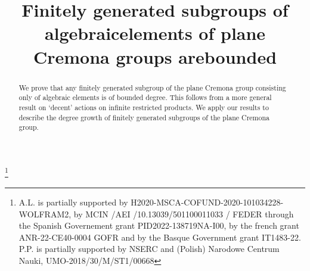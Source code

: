 \documentclass[JEP,XML,SOM,Unicode, NoEqCountersInSection,published]{cedram}
\theoremstyle{plain}
\theoremstyle{definition}
\begin{document}
\frontmatter

\title[Finitely generated subgroups of algebraic elements]{Finitely generated subgroups of algebraic\nobreakspace elements of plane Cremona groups are\nobreakspace bounded}

\author[\initial{A.} \lastname{Lonjou}]{ }
\address{Department of Mathematics, University of the Basque Country UPV/EHU, \\
Sarriena s/n, 48940 Leioa, Bizkaia, Spain\\
\& IKERBASQUE, Basque Foundation for Science,\\ Bilbao, Spain}
\urladdr{}

\author[\initial{P.} \lastname{Przytycki}]{ }
\address{Department of Mathematics and Statistics,
McGill University,\\
Burnside Hall,
805 Sherbrooke Street West,
Montreal, QC,
H3A 0B9, Canada}
\urladdr{}

\author[\initial{C.} \lastname{Urech}]{ }
\address{Department of Mathematics,
ETH Zürich,\\
Rämistrasse 101,
8092 Zürich, Switzerland}
\urladdr{}

\thanks{A.L. is partially supported by H2020-MSCA-COFUND-2020-101034228-WOLFRAM2, by MCIN /AEI /10.13039/501100011033 / FEDER through the Spanish Governement grant PID2022-138719NA-I00, by the french grant ANR-22-CE40-0004 GOFR and by the Basque Government grant IT1483-22. P.P. is partially supported by NSERC and (Polish) Narodowe Centrum Nauki, UMO-2018/30/M/ST1/00668}

\begin{abstract}
We prove that any finitely generated subgroup of the plane Cremona group consisting only of algebraic elements is of bounded degree. This follows from a more general result on `decent' actions on infinite restricted products. We apply our results to describe the degree growth of finitely generated subgroups of the plane Cremona group.
\end{abstract}



\end{document}
